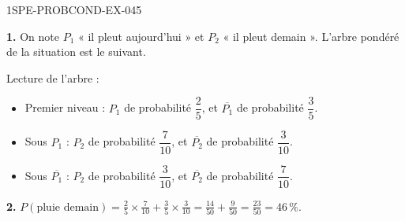 \begin{corrige}{1SPE-PROBCOND-EX-045}

\textbf{1.} On note $P_1$ « il pleut aujourd'hui » et $P_2$ « il pleut demain ». L'arbre pondéré de la situation est le suivant.

\begin{nxarbreproba}
\end{nxarbreproba}

Lecture de l'arbre :

\begin{itemize}
  \item Premier niveau : $P_1$ de probabilité $\dfrac{2}{5}$, et $\overline{P_1}$ de probabilité $\dfrac{3}{5}$.
  \item Sous $P_1$ : $P_2$ de probabilité $\dfrac{7}{10}$, et $\overline{P_2}$ de probabilité $\dfrac{3}{10}$.
  \item Sous $\overline{P_1}$ : $P_2$ de probabilité $\dfrac{3}{10}$, et $\overline{P_2}$ de probabilité $\dfrac{7}{10}$.
\end{itemize}

\medskip

\textbf{2.} $P(\text{pluie demain}) = \frac{2}{5}\times\frac{7}{10}+\frac{3}{5}\times\frac{3}{10} = \frac{14}{50}+\frac{9}{50} = \frac{23}{50} = 46\,\%$.

\end{corrige}
